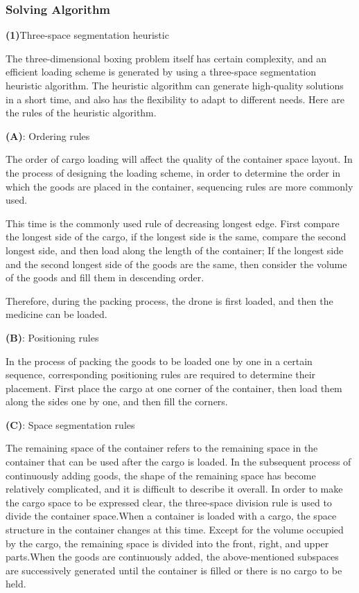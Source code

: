 \documentclass{article} %
\begin{document}
\subsubsection{Solving Algorithm}
\textbf{(1)}Three-space segmentation heuristic


The three-dimensional boxing problem itself has certain complexity, and an efficient loading scheme is generated by using a three-space segmentation heuristic algorithm.
The heuristic algorithm can generate high-quality solutions in a short time, and also has the flexibility to adapt to different needs. Here are the rules of the heuristic algorithm.

    \textbf{(A)}: Ordering rules

The order of cargo loading will affect the quality of the container space layout. In the process of designing the loading scheme, in order to determine the order in which the goods are placed in the container, sequencing rules are more commonly used.

This time is the commonly used rule of decreasing longest edge.
First compare the longest side of the cargo, if the longest side is the same, compare the second longest side, and then load along the length of the container;
If the longest side and the second longest side of the goods are the same, then consider the volume of the goods and fill them in descending order.

Therefore, during the packing process, the drone is first loaded, and then the medicine can be loaded.

    \textbf{(B)}: Positioning rules

In the process of packing the goods to be loaded one by one in a certain sequence, corresponding positioning rules are required to determine their placement.
First place the cargo at one corner of the container, then load them along the sides one by one, and then fill the corners.

   \textbf{(C)}: Space segmentation rules

The remaining space of the container refers to the remaining space in the container that can be used after the cargo is loaded.
In the subsequent process of continuously adding goods, the shape of the remaining space has become relatively complicated, and it is difficult to describe it overall.
In order to make the cargo space to be expressed clear, the three-space division rule is used to divide the container space.When a container is loaded with a cargo, the space structure in the container changes at this time. Except for the volume occupied by the cargo, the remaining space is divided into the front, right, and upper parts.When the goods are continuously added, the above-mentioned subspaces are successively generated until the container is filled or there is no cargo to be held.
\end{document}

